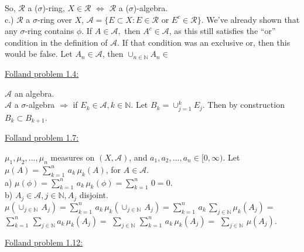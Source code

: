 \documentclass[12pt]{article}
\begin{document}
\begin{flushleft}
So, $\mathcal{R}$ a ($\sigma$)-ring, $X \in \mathcal{R}$ $\Leftrightarrow$ $\mathcal{R}$ a ($\sigma$)-algebra.\\
c.) $\mathcal{R}$ a $\sigma$-ring over $X$, $\mathcal{A} = \{ E \subset X: E \in \mathcal{R} $ or $ E^c \in \mathcal{R} \}$. We've already shown that any $\sigma$-ring contains $\phi$. If $A \in \mathcal{A},$ then $A^c  \in \mathcal{A}$, as this still satisfies the ``or'' condition in the definition of $\mathcal{A}$. If that condition was an exclusive or, then this would be false. Let $A_n \in \mathcal{A}$, then $\cup_{n\in\mathbb{N}} A_n \in $	
\end{flushleft}





\begin{flushleft}
\underline{Folland problem 1.4:}
\end{flushleft}

\begin{flushleft}
$\mathcal{A}$ an algebra.\\
$\mathcal{A}$ a $\sigma$-algebra $\Rightarrow$ if $E_k \in \mathcal{A}, k \in \mathbb{N}$. Let $B_k = \cup_{j=1}^k E_j$. Then by construction $B_k \subset B_{k+1}$.
\end{flushleft}




\begin{flushleft}
\underline{Folland problem 1.7:}
\end{flushleft}

\begin{flushleft}
$\mu_1,\mu_2,...,\mu_n$ measures on $(X,\mathcal{A})$, and $a_1,a_2,...,a_n \in [0,\infty)$.
Let $\mu(A) = \sum_{k=1}^n \, a_k \, \mu_k(A)$, for $A \in \mathcal{A}$.\\
a) $\mu(\phi) = \sum_{k=1}^n \, a_k \, \mu_k(\phi) = \sum_{k=1}^n \, 0 = 0.$\\
b) $A_j \in \mathcal{A}, j \in \mathbb{N}, A_j$ disjoint. $\mu(\cup_{j\in \mathbb{N}} \, A_j) = \sum_{k=1}^n \, a_k \, \mu_k(\cup_{j\in \mathbb{N}} \, A_j) = \sum_{k=1}^n \, a_k \, \sum_{j\in \mathbb{N}} \mu_k( A_j)= $
$ \sum_{k=1}^n \, \sum_{j \in \mathbb{N}} a_k \, \mu_k(A_j)= $ $ \sum_{j \in \mathbb{N}} \, \sum_{k=1}^n \, a_k \, \mu_k(A_j)= $ $ \sum_{j \in \mathbb{N}} \, \mu(A_j)$. 
\end{flushleft}

\begin{flushleft}
\underline{Folland problem 1.12:}
\end{flushleft}
\end{document}
